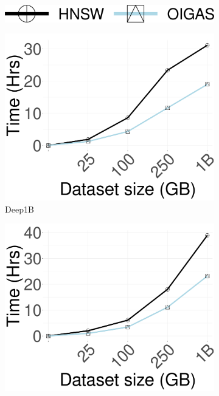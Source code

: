 \begin{figure}[htbp]
    \centering
    \captionsetup{justification=centering}
	\centering

		\captionsetup{justification=centering}
		\captionsetup[subfigure]{justification=centering}
        \begin{subfigure}[b]{\textwidth}
        \centering
 		\includegraphics[width=0.3\columnwidth]{../img/oigas/Search/legend.png}
    \end{subfigure}
    
            \begin{subfigure}[b]{0.3\textwidth}
            \centering
                \includegraphics[width=\textwidth]{../img/oigas/IDX/idx_time_deep_n.png}
                \caption{Deep1B}
        \label{fig:oigasidx:1Bdeep_Time}
    \end{subfigure}
    \hspace{0.4cm}
    \centering
             \begin{subfigure}[b]{0.3\textwidth}
                \includegraphics[width=\textwidth]{../img/oigas/IDX/idx_time_sift_n.png}

\end{subfigure}
\end{figure}
